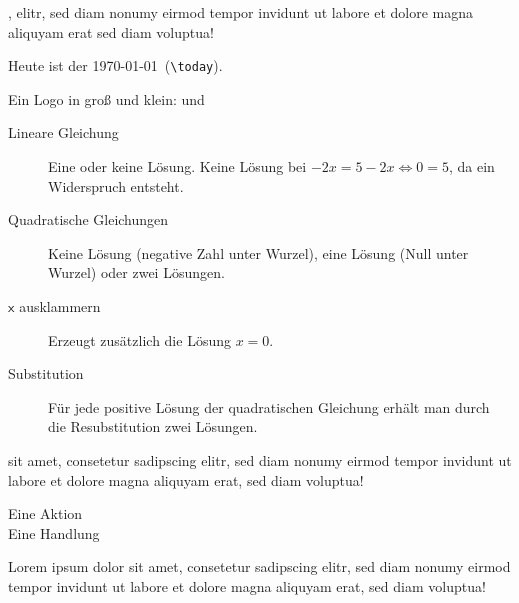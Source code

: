 \documentclass[
parindent=false,
parskip=true,
parts=true,
colortheme=wu,
styletheme=wu,
shownotess=true,
showresults=false
]{edu}
\begin{document}

 ,  \textrightarrow elitr, sed diam nonumy eirmod tempor invidunt ut labore et dolore magna aliquyam erat \textRightarrow sed diam voluptua! 

Heute ist der \today\ (\lstinline!\today!).

Ein Logo in groß und klein: \ccbysa und \ccbysa*
\begin{description}
	\item[Lineare Gleichung] Eine oder keine Lösung. Keine Lösung \zB bei $-2x = 5 - 2x \Leftrightarrow 0 = 5$, da ein Widerspruch entsteht.
	\item[Quadratische Gleichungen] Keine Lösung (negative Zahl unter Wurzel), eine Lösung (Null unter Wurzel) oder zwei Lösungen.
  \item[$\mathsf{x}$ ausklammern] Erzeugt zusätzlich die Lösung $x = 0$.
  \item[Substitution] Für jede positive Lösung der quadratischen Gleichung erhält man durch die Resubstitution zwei Lösungen.
\end{description}

 sit amet, consetetur sadipscing elitr, sed diam nonumy eirmod tempor invidunt ut labore et dolore magna aliquyam erat, sed diam voluptua!

\action Eine Aktion\\
\speech Eine Handlung


\newpage
Lorem ipsum dolor sit amet, consetetur sadipscing elitr, sed diam nonumy eirmod tempor invidunt ut labore et dolore magna aliquyam erat, sed diam voluptua! 
\end{document}

